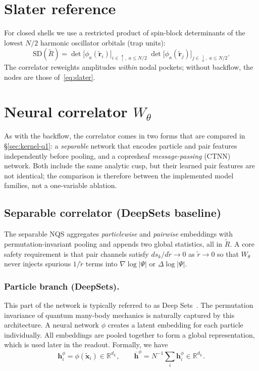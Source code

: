 \section{Slater reference}
\label{subsec:slater}
For closed shells we use a restricted product of spin-block determinants of the lowest $N/2$ harmonic oscillator orbitals (trap units):
\begin{equation}
  \mathrm{SD}(\tilde{R})
  =
  \det\!\big[\phi_a(\tilde{\mathbf r}_i)\big]_{i\in\uparrow,\;a\le N/2}\;
  \det\!\big[\phi_a(\tilde{\mathbf r}_j)\big]_{j\in\downarrow,\;a\le N/2}.
  \label{eq:slater}
\end{equation}
The correlator reweights amplitudes \emph{within} nodal pockets; without backflow, the nodes are those of~\eqref{eq:slater}.

\section{Neural correlator $W_\theta$}
\label{subsec:nqs}
As with the backflow, the correlator comes in two forms that are compared in
\S\ref{sec:kernel-q1}: a \emph{separable} network that encodes particle and pair features
independently before pooling, and a copresheaf \emph{message-passing} (CTNN) network. Both
include the same analytic cusp, but their learned pair features are not identical; the
comparison is therefore between the implemented model families, not a one-variable ablation.

\subsection{Separable correlator (DeepSets baseline)}
\label{subsec:separable-correlator}
The separable NQS aggregates \emph{particlewise} and \emph{pairwise} embeddings with permutation-invariant pooling and appends two global
statistics, all in $\tilde{R}$. A core safety requirement is that pair channels satisfy $d s_k/d\tilde r \to 0$ as $\tilde r\to 0$
so that $W_\theta$ never injects spurious $1/\tilde r$ terms into $\nabla\log|\Psi|$ or $\Delta\log|\Psi|$.

\subsubsection{Particle branch (DeepSets).}
This part of the network is typically referred to as Deep Sets~\cite{Zaheer2017-DeepSets}. The permutation invariance of quantum many-body mechanics is naturally captured by this architecture. 
A neural network $\phi$ creates a latent embedding for each particle individually. All embeddings are pooled together to form a global representation, which is used later in the readout. Formally, we have
\[
  \mathbf h_i^\phi=\phi(\tilde{\mathbf x}_i)\in\mathbb R^{d_L},\qquad
  \overline{\mathbf h}^{\phi}=N^{-1}\sum_i \mathbf h_i^\phi\in\mathbb R^{d_L}.
\]

